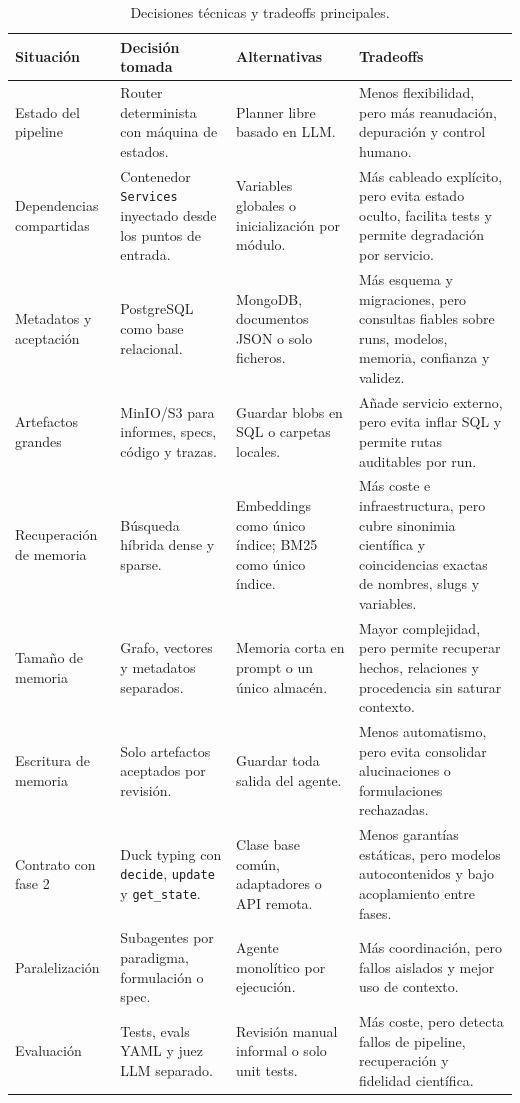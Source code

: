 \begin{table}[H]
\begin{center}
\scriptsize
\begin{tabular}{|p{2.5cm}|p{3.1cm}|p{3.2cm}|p{3.7cm}|} \hline
\textbf{Situación} & \textbf{Decisión tomada} & \textbf{Alternativas} & \textbf{Tradeoffs} \\ \hline
Estado del pipeline & Router determinista con máquina de estados. & Planner libre basado en LLM. & Menos flexibilidad, pero más reanudación, depuración y control humano. \\ \hline
Dependencias compartidas & Contenedor \texttt{Services} inyectado desde los puntos de entrada. & Variables globales o inicialización por módulo. & Más cableado explícito, pero evita estado oculto, facilita tests y permite degradación por servicio. \\ \hline
Metadatos y aceptación & PostgreSQL como base relacional. & MongoDB, documentos JSON o solo ficheros. & Más esquema y migraciones, pero consultas fiables sobre runs, modelos, memoria, confianza y validez. \\ \hline
Artefactos grandes & MinIO/S3 para informes, specs, código y trazas. & Guardar blobs en SQL o carpetas locales. & Añade servicio externo, pero evita inflar SQL y permite rutas auditables por run. \\ \hline
Recuperación de memoria & Búsqueda híbrida dense y sparse. & Embeddings como único índice; BM25 como único índice. & Más coste e infraestructura, pero cubre sinonimia científica y coincidencias exactas de nombres, slugs y variables. \\ \hline
Tamaño de memoria & Grafo, vectores y metadatos separados. & Memoria corta en prompt o un único almacén. & Mayor complejidad, pero permite recuperar hechos, relaciones y procedencia sin saturar contexto. \\ \hline
Escritura de memoria & Solo artefactos aceptados por revisión. & Guardar toda salida del agente. & Menos automatismo, pero evita consolidar alucinaciones o formulaciones rechazadas. \\ \hline
Contrato con fase 2 & Duck typing con \texttt{decide}, \texttt{update} y \texttt{get\_state}. & Clase base común, adaptadores o API remota. & Menos garantías estáticas, pero modelos autocontenidos y bajo acoplamiento entre fases. \\ \hline
Paralelización & Subagentes por paradigma, formulación o spec. & Agente monolítico por ejecución. & Más coordinación, pero fallos aislados y mejor uso de contexto. \\ \hline
Evaluación & Tests, evals YAML y juez LLM separado. & Revisión manual informal o solo unit tests. & Más coste, pero detecta fallos de pipeline, recuperación y fidelidad científica. \\ \hline
\end{tabular}
\caption{Decisiones técnicas y tradeoffs principales.}
\end{center}
\end{table}

